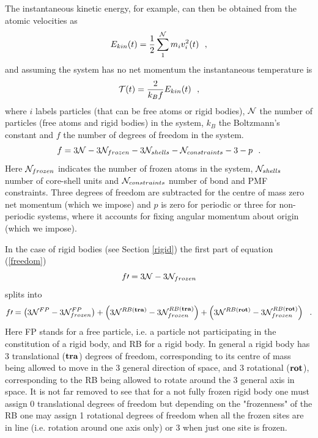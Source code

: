 The instantaneous kinetic energy, for example, can then be
obtained from the atomic velocities as
\begin{equation}
E_{kin}(t) = {1 \over 2} \sum_{1}^{\cal N} m_{i} v_{i}^{2}(t)~~, \label{ekin}
\end{equation}
and assuming the system has no net momentum the instantaneous
temperature is
\begin{equation}
{\cal T}(t) = \frac{2}{k_{B} f} E_{kin}(t)~~, \label{tinst}
\end{equation}
where $i$ labels particles (that can be free atoms or
rigid bodies), ${\cal N}$ the number of particles
(free atoms and rigid bodies) in
the system, $k_{B}$ the Boltzmann's constant and $f$ the number of
degrees of freedom in the system.
\begin{equation}
f = 3{\cal N} - 3{\cal N}_{frozen} - 3{\cal N}_{shells} -
{\cal N}_{constraints} - 3 - p~~. \label{freedom}
\end{equation}
Here ${\cal N}_{frozen}$ indicates the number of frozen atoms in
the system, ${\cal N}_{shells}$ number of core-shell units and
${\cal N}_{constraints}$ number of bond and PMF constraints.
Three degrees of freedom are subtracted for the centre of mass
zero net momentum (which we impose) and $p$ is zero for periodic
or three for non-periodic systems, where it accounts for fixing
angular momentum about origin (which we impose).

In the case of rigid bodies (see Section \ref{rigid})
the first part of equation (\ref{freedom})
\begin{equation}
f{\prime} = 3{\cal N} - 3{\cal N}_{frozen}
\end{equation}
splits into
\begin{equation}
f{\prime} = \left( 3{\cal N}^{FP} - 3{\cal N}^{FP}_{frozen} \right) +
            \left( 3{\cal N}^{RB {\bf (tra)}} - 3{\cal N}^{RB {\bf (tra)}}_{frozen} \right) +
            \left( 3{\cal N}^{RB {\bf (rot)}} - 3{\cal N}^{RB {\bf (rot)}}_{frozen} \right)~~.
\end{equation}
Here FP stands for a free particle, i.e. a particle not
participating in the constitution of a rigid body, and RB for a
rigid body.  In general a rigid body has 3 translational (${\bf tra}$)
degrees of freedom, corresponding to its centre of mass being allowed
to move in the 3 general direction of space, and 3 rotational
(${\bf rot}$), corresponding to the RB being allowed to rotate around
the 3 general axis in space.  It is not far removed to see that for
a not fully frozen rigid body one must assign 0 translational degrees
of freedom but depending on the "frozenness" of the RB one may assign
1 rotational degrees of freedom when all the frozen sites are in line
(i.e. rotation around one axis only) or 3 when just one site is frozen.

